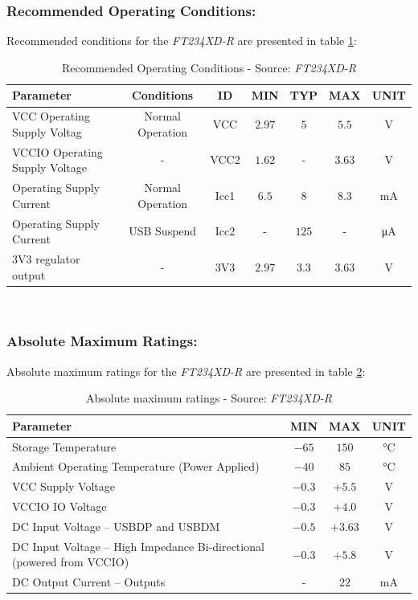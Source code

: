 \documentclass[report.tex]{subfiles}
\begin{document}
\subsubsection{Recommended Operating Conditions:}
Recommended conditions for the \textit{FT234XD-R} are presented in table \ref{tab:FTDIUSB_rec_op}:
\begin{table}[H]
\centering
\begin{tabularx}{\textwidth}{|X|c|c|c|c|c|c|}
\hline
\textbf{Parameter} & \textbf{Conditions} & \textbf{ID} & \textbf{MIN} & \textbf{TYP} & \textbf{MAX}        & \textbf{UNIT} \\\hline
VCC Operating Supply Voltag & Normal Operation & VCC & $2.97$ & $5$ & $5.5$ &\si{\volt}\\\hline
VCCIO Operating Supply Voltage & - & VCC2 & $1.62$ & - & $3.63$ & \si{\volt}\\\hline
Operating Supply Current & Normal Operation & Icc1 & $6.5$ & $8$ & $8.3$ & \si{\milli\ampere}\\\hline
Operating Supply Current & USB Suspend & Icc2 & - & $125$ & - & \si{\micro\ampere}\\\hline
3V3 regulator output & - & 3V3 & $2.97$ & $3.3$ & $3.63$ & \si{\volt}\\\hline
\end{tabularx}
\caption{Recommended Operating Conditions - Source: \textit{FT234XD-R}\cite{FTDIUSB}}
\label{tab:FTDIUSB_rec_op}
\end{table}
\;\\[-60pt]
\subsubsection{Absolute Maximum Ratings:}
Absolute maximum ratings for the \textit{FT234XD-R} are presented in table \ref{tab:FTDIUSB_abs_max}:

\begin{table}[H]
\centering
\begin{tabularx}{\textwidth}{|X|c|c|c|}
\hline
\textbf{Parameter} & \textbf{MIN} & \textbf{MAX} & \textbf{UNIT} \\\hline
Storage Temperature & $-65$ & $150$ & \si{\celsius}\\\hline
Ambient Operating Temperature (Power Applied) & $-40$ & $85$ & \si{\celsius}\\\hline
VCC Supply Voltage & $-0.3$ & $+5.5$ & \si{\volt}\\\hline
VCCIO IO Voltage & $-0.3$ & $+4.0$ & \si{\volt}\\\hline
DC Input Voltage – USBDP and USBDM & $-0.5$ & $+3.63$ & \si{\volt}\\\hline
DC Input Voltage – High Impedance Bi-directional (powered from VCCIO) & $-0.3$ & $+5.8$ & \si{\volt}\\\hline
DC Output Current – Outputs & - & $22$ & \si{\milli\ampere}\\\hline
\end{tabularx}
\caption{Absolute maximum ratings - Source: \textit{FT234XD-R}\cite{FTDIUSB}}
\label{tab:FTDIUSB_abs_max}
\end{table}
\;\\[-60pt]
\end{document}

